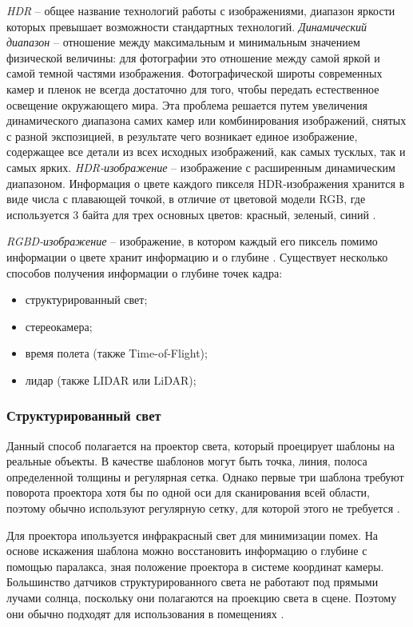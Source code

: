 \textit{HDR} -- общее название технологий работы с изображениями, диапазон яркости которых превышает возможности стандартных технологий. \textit{Динамический диапазон} -- отношение между максимальным и минимальным значением физической величины: для фотографии это отношение между самой яркой и самой темной частями изображения. Фотографической широты современных камер и пленок не всегда достаточно для того, чтобы передать естественное освещение окружающего мира. Эта проблема решается путем увеличения динамического диапазона самих камер или комбинирования изображений, снятых с разной экспозицией, в результате чего возникает единое изображение, содержащее все детали из всех исходных изображений, как самых тусклых, так и самых ярких. \textit{HDR-изображение} -- изображение с расширенным динамическим диапазоном. Информация о цвете каждого пикселя HDR-изображения хранится в виде числа с плавающей точкой, в отличие от цветовой модели RGB, где используется 3 байта для трех основных цветов: красный, зеленый, синий \cite{hdri}.

\textit{RGBD-изображение} -- изображение, в котором каждый его пиксель помимо информации о цвете хранит информацию и о глубине \cite{rgbd}. Существует несколько способов получения информации о глубине точек кадра:

\begin{itemize}
	\item структурированный свет;
	\item стереокамера;
	\item время полета (также Time-of-Flight);
	\item лидар (также LIDAR или LiDAR);
\end{itemize}

\subsubsection*{Структурированный свет}

Данный способ полагается на проектор света, который проецирует шаблоны на реальные объекты. В качестве шаблонов могут быть точка, линия, полоса определенной толщины и регулярная сетка. Однако первые три шаблона требуют поворота проектора хотя бы по одной оси для сканирования всей области, поэтому обычно используют регулярную сетку, для которой этого не требуется \cite{struct_light}. 

Для проектора ипользуется инфракрасный свет для минимизации помех. На основе искажения шаблона можно восстановить информацию о глубине с помощью паралакса, зная положение проектора в системе координат камеры. Большинство датчиков структурированного света не работают под прямыми лучами солнца, поскольку они полагаются на проекцию света в сцене. Поэтому они обычно подходят для использования в помещениях \cite{struct_light}.

